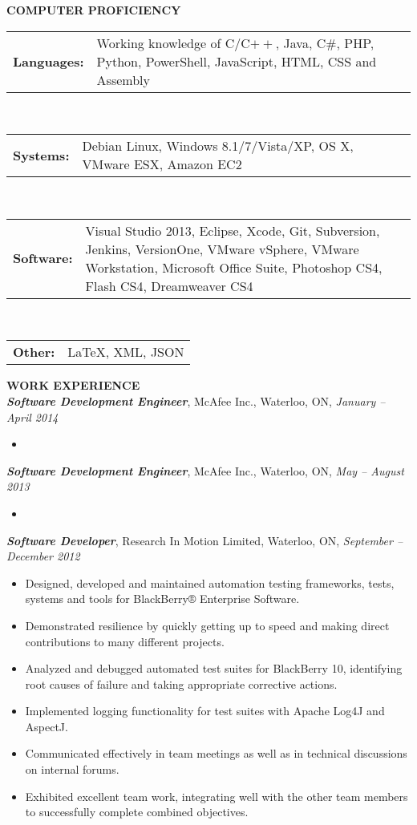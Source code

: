 \documentclass[10pt,letterpaper]{article}
\newcommand{\proficiency}[2]
{
\begin{tabular}{p{0.1\columnwidth} p{0.75\columnwidth}}
    \textbf{#1} & #2
\end{tabular}
}
\newcommand{\job}[4]
{
    \emph{\textbf{#1}}, #2, #3, \emph{#4}
}
\begin{document}
\textbf{COMPUTER PROFICIENCY} \hrulefill \\
\begin{adjustwidth}{0.1in}{0.5in}
    \proficiency{Languages:}{ Working knowledge of C/C$++$, Java, C\#, PHP, Python, PowerShell, JavaScript, HTML, CSS 
			     and Assembly }\\
    \proficiency{Systems:}  { Debian Linux, Windows 8.1/7/Vista/XP, OS X, VMware ESX, Amazon EC2 }\\
    \proficiency{Software:} { Visual Studio 2013, Eclipse, Xcode, Git, Subversion, Jenkins, VersionOne, VMware vSphere, 
			     VMware Workstation, Microsoft Office Suite, Photoshop CS4, Flash CS4, Dreamweaver CS4 }\\
    \proficiency{Other:}    { \LaTeX, XML, JSON }
\end{adjustwidth}
\vspace{0.5em}
\textbf{WORK EXPERIENCE} \hrulefill \\[0.5em]
\job{Software Development Engineer}{McAfee Inc.}{Waterloo, ON}{January -- April 2014}\\
\begin{adjustwidth}{0.1in}{0.5in}
    \begin{itemize}
	\item
    \end{itemize}
\end{adjustwidth}
\vspace{0.5em}		
\job{Software Development Engineer}{McAfee Inc.}{Waterloo, ON}{May -- August 2013}\\
\begin{adjustwidth}{0.1in}{0.5in}
    \begin{itemize}
	\item
    \end{itemize}
\end{adjustwidth}
\vspace{0.5em}
\job{Software Developer}{Research In Motion Limited}{Waterloo, ON}{September -- December 2012}\\
\begin{adjustwidth}{0.1in}{0.5in}
    \begin{itemize}
	\item Designed, developed and maintained automation testing frameworks, tests, systems and tools for 
	    BlackBerry® Enterprise Software.
	\item Demonstrated resilience by quickly getting up to speed and making direct contributions to many different 
	    projects.
	\item Analyzed and debugged automated test suites for BlackBerry 10, identifying root causes of failure and 
	    taking appropriate corrective actions.
	\item Implemented logging functionality for test suites with Apache Log4J and AspectJ.
	\item Communicated effectively in team meetings as well as in technical discussions on internal forums.
	\item Exhibited excellent team work, integrating well with the other team members to successfully complete 
	    combined objectives.
    \end{itemize}
\end{adjustwidth}
\end{document}
